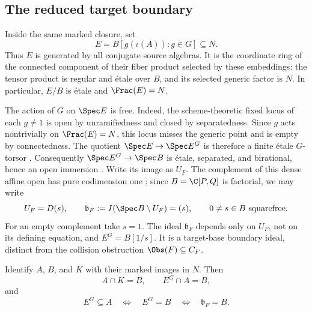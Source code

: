 
\subsection{The reduced target boundary}

Inside the same marked closure, set
\[
  E=B[g(\iota(A)):g\in G]\subseteq N.
\]
Thus \(E\) is generated by all conjugate source algebras.  It is the
coordinate ring of the connected component of their fiber product
selected by these embeddings: the tensor product is regular and
\'etale over \(B\), and its selected generic factor is \(N\).
In particular, \(E/B\) is \'etale and \(\Frac(E)=N\).

The action of \(G\) on \(\Spec E\) is free.  Indeed, the scheme-theoretic
fixed locus of each \(g\ne1\) is open by unramifiedness and closed by
separatedness.  Since \(g\) acts nontrivially on \(\Frac(E)=N\), this
locus misses the generic point and is empty by connectedness.
The quotient \(\Spec E\to\Spec E^G\) is therefore a finite \'etale
\(G\)-torsor \cite{StacksFiniteFreeQuotient}.
Consequently \(\Spec E^G\to\Spec B\) is \'etale, separated, and
birational, hence an open immersion \cite{StacksBirationalEtaleOpen}.
Write its image as \(U_F\).  The complement of this dense affine open
has pure codimension one \cite{StacksAffineComplement}; since
\(B=\C[P,Q]\) is factorial, we may write
\[
  U_F=D(s),\qquad
  \mathfrak b_F:=I(\Spec B\setminus U_F)=(s),
  \qquad 0\ne s\in B\ \text{squarefree}.
\]
For an empty complement take \(s=1\).  The ideal \(\mathfrak b_F\)
depends only on \(U_F\), not on its defining equation, and
\(E^G=B[1/s]\).  It is a target-base boundary ideal, distinct from
the collision obstruction \(\Obs(F)\subseteq C_F\).

\begin{proposition}
\label{prop:source-regularity-criterion}
Identify \(A\), \(B\), and \(K\) with their marked images in \(N\).
Then
\[
  A\cap K=B,\qquad E^G\cap A=B,
\]
and
\[
  E^G\subseteq A
  \quad\Longleftrightarrow\quad E^G=B
  \quad\Longleftrightarrow\quad \mathfrak b_F=B.
\]
\end{proposition}

